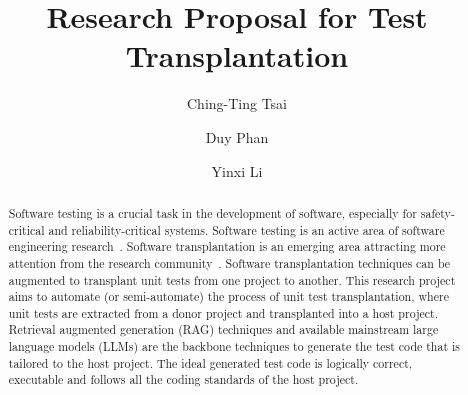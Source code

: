 \documentclass[sigconf]{acmart}
\begin{document}
\title{Research Proposal for Test Transplantation}

\author{Ching-Ting Tsai}

\author{Duy Phan}

\author{Yinxi Li}


\renewcommand{\shortauthors}{Trovato et al.}

\begin{abstract}
%
Software testing is a crucial task in the development of software, especially for safety-critical and reliability-critical systems.
%
Software testing is an active area of software engineering research~\cite{alshahwan2023_softwaretestingchallenges}.
%
Software transplantation is an emerging area attracting more attention from the research community~\cite{alshahwan2023_softwaretestingchallenges}.
%
Software transplantation techniques can be augmented to transplant unit tests from one project to another. 
%
This research project aims to automate (or semi-automate) the process of unit test transplantation, where unit tests are extracted from a donor project and transplanted into a host project.
%
Retrieval augmented generation (RAG) techniques and available mainstream large language models (LLMs) are the backbone techniques to generate the test code that is tailored to the host project.
%
The ideal generated test code is logically correct, executable and follows all the coding standards of the host project.
%
\end{abstract}
\end{document}
